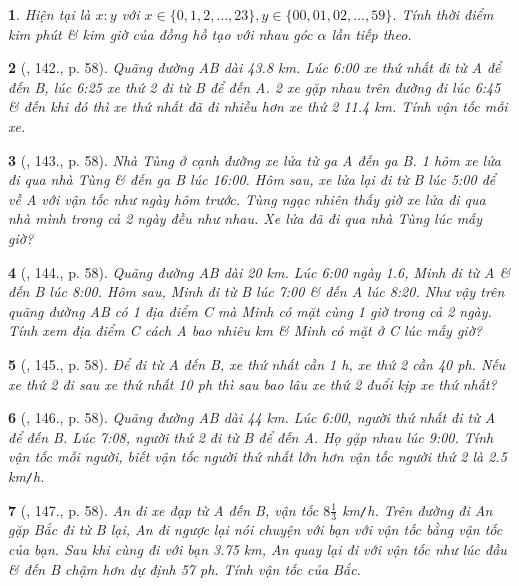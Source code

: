 \documentclass{article}
\newtheorem{baitoan}{}
\begin{document}
\begin{baitoan}
	Hiện tại là $x:y$ với $x\in\{0,1,2,\ldots,23\},y\in\{00,01,02,\ldots,59\}$. Tính thời điểm kim phút \& kim giờ của đồng hồ tạo với nhau góc $\alpha$ lần tiếp theo.
\end{baitoan}

\begin{baitoan}[\cite{Binh_Toan_6_tap_2}, 142., p. 58]
	Quãng đường AB dài {\rm43.8 km}. Lúc {\rm6:00} xe thứ nhất đi từ A để đến B, lúc {\rm6:25} xe thứ 2 đi từ B để đến A. 2 xe gặp nhau trên đường đi lúc {\rm6:45} \& đến khi đó thì xe thứ nhất đã đi nhiều hơn xe thứ 2 {\rm11.4 km}. Tính vận tốc mỗi xe.
\end{baitoan}

\begin{baitoan}[\cite{Binh_Toan_6_tap_2}, 143., p. 58]
	Nhà Tùng ở cạnh đường xe lửa từ ga A đến ga B. 1 hôm xe lửa đi qua nhà Tùng \& đến ga B lúc {\rm16:00}. Hôm sau, xe lửa lại đi từ B lúc {\rm5:00} để về A với vận tốc như ngày hôm trước. Tùng ngạc nhiên thấy giờ xe lửa đi qua nhà mình trong cả 2 ngày đều như nhau. Xe lửa đã đi qua nhà Tùng lúc mấy giờ?
\end{baitoan}

\begin{baitoan}[\cite{Binh_Toan_6_tap_2}, 144., p. 58]
	Quãng đường AB dài {\rm20 km}. Lúc {\rm6:00} ngày 1.6, Minh đi từ A \& đến B lúc {\rm8:00}. Hôm sau, Minh đi từ B lúc {\rm7:00} \& đến A lúc {\rm8:20}. Như vậy trên quãng đường AB có 1 địa điểm C mà Minh có mặt cùng 1 giờ trong cả 2 ngày. Tính xem địa điểm C cách A bao nhiêu {\rm km} \& Minh có mặt ở C lúc mấy giờ?
\end{baitoan}

\begin{baitoan}[\cite{Binh_Toan_6_tap_2}, 145., p. 58]
	Để đi từ A đến B, xe thứ nhất cần {\rm1 h}, xe thứ 2 cần {\rm40 ph}. Nếu xe thứ 2 đi sau xe thứ nhất {\rm10 ph} thì sau bao lâu xe thứ 2 đuổi kịp xe thứ nhất?
\end{baitoan}

\begin{baitoan}[\cite{Binh_Toan_6_tap_2}, 146., p. 58]
	Quãng đường AB dài {\rm44 km}. Lúc {\rm6:00}, người thứ nhất đi từ A để đến B. Lúc {\rm7:08}, người thứ 2 đi từ B để đến A. Họ gặp nhau lúc {\rm9:00}. Tính vận tốc mỗi người, biết vận tốc người thứ nhất lớn hơn vận tốc người thứ 2 là {\rm2.5 km{\tt/}h}.
\end{baitoan}

\begin{baitoan}[\cite{Binh_Toan_6_tap_2}, 147., p. 58]
	An đi xe đạp từ A đến B, vận tốc $8\frac{1}{3}$ {\rm km{\tt/}h}. Trên đường đi An gặp Bắc đi từ B lại, An đi ngược lại nói chuyện với bạn với vận tốc bằng vận tốc của bạn. Sau khi cùng đi với bạn {\rm3.75 km}, An quay lại đi với vận tốc như lúc đầu \& đến B chậm hơn dự định {\rm57 ph}. Tính vận tốc của Bắc.
\end{baitoan}
\end{document}
